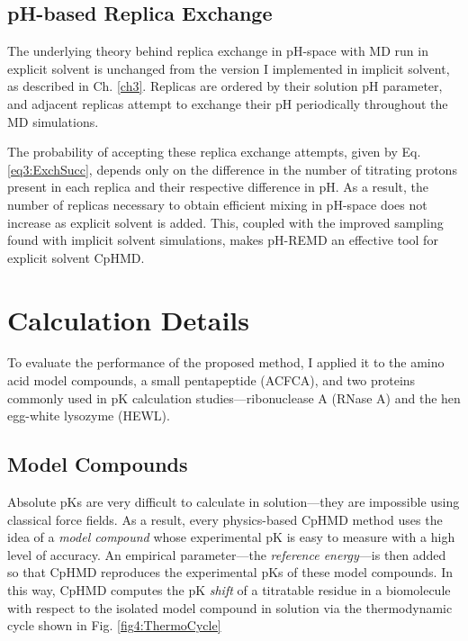 \subsection{pH-based Replica Exchange}

The underlying theory behind replica exchange in pH-space with MD run in
explicit solvent is unchanged from the version I implemented in implicit
solvent, as described in Ch. \ref{ch3}.
\cite{Swails_JChemTheoryComput_2012_v8_p4393, Itoh_Proteins_2011_v79_p3420}
Replicas are ordered by their solution pH parameter, and adjacent replicas
attempt to exchange their pH periodically throughout the MD simulations.

The probability of accepting these replica exchange attempts, given by
Eq. \ref{eq3:ExchSucc}, depends only on the difference in the number of
titrating protons present in each replica and their respective difference in pH.
\cite{Swails_JChemTheoryComput_2012_v8_p4393} As a result, the number of
replicas necessary to obtain efficient mixing in pH-space does not increase as
explicit solvent is added. This, coupled with the improved sampling found with
implicit solvent simulations, \cite{Swails_JChemTheoryComput_2012_v8_p4393}
makes pH-REMD an effective tool for explicit solvent CpHMD.

\section{Calculation Details}

To evaluate the performance of the proposed method, I applied it to the amino
acid model compounds, a small pentapeptide (ACFCA), and two proteins commonly
used in pK calculation studies---ribonuclease A (RNase A) and the hen
egg-white lysozyme (HEWL).

\subsection{Model Compounds}

Absolute pKs are very difficult to calculate in solution---they are
impossible using classical force fields. As a result, every physics-based CpHMD
method uses the idea of a \emph{model compound} whose experimental pK is
easy to measure with a high level of accuracy. An empirical parameter---the
\emph{reference energy}---is then added so that CpHMD reproduces the
experimental pKs of these model compounds. In this way, CpHMD computes
the pK \emph{shift} of a titratable residue in a biomolecule with respect
to the isolated model compound in solution via the thermodynamic cycle shown in
Fig. \ref{fig4:ThermoCycle}


